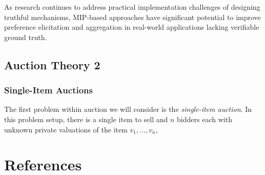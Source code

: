 \documentclass[
  letterpaper,
  DIV=11,
  numbers=noendperiod,
  oneside]{scrreprt}
\theoremstyle{remark}
\begin{document}
As research continues to address practical implementation challenges of
designing truthful mechanisms, MIP-based approaches have significant
potential to improve preference elicitation and aggregation in
real-world applications lacking verifiable ground truth.

\subsection{Auction Theory 2}\label{auction-theory-2}

\subsubsection*{Single-Item Auctions}\label{single-item-auctions-1}

The first problem within auction we will consider is the
\emph{single-item auction}. In this problem setup, there is a single
item to sell and \(n\) bidders each with unknown private valuations of
the item \(v_1, \ldots, v_n\),

\section*{References}\label{bibliography-3}

\end{document}
